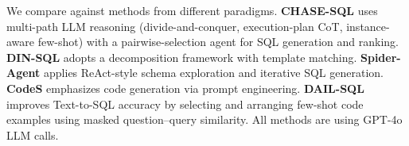 \documentclass{article} %
\begin{document}










We compare against methods from different paradigms. \textbf{CHASE-SQL} \citep{pourreza2024chase} uses multi-path LLM reasoning (divide-and-conquer, execution-plan CoT, instance-aware few-shot) with a pairwise-selection agent for SQL generation and ranking. \textbf{DIN-SQL} \citep{pourreza2024din} adopts a decomposition framework with template matching. \textbf{Spider-Agent} \citep{lei2024spider} applies ReAct-style schema exploration and iterative SQL generation. \textbf{CodeS} \citep{CodeS} emphasizes code generation via prompt engineering. \textbf{DAIL-SQL} \citep{gao2023text} improves Text-to-SQL accuracy by selecting and arranging few-shot code examples using masked question–query similarity. All methods are using GPT-4o LLM calls.
\end{document}
